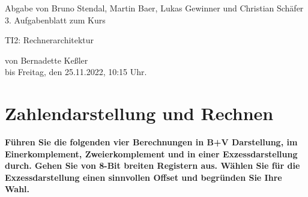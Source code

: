 \documentclass[11pt]{article}
\newcommand{\VORLESUNG}{TI2: Rechnerarchitektur}
\newcommand{\STUDENTS}{Bruno Stendal, Martin Baer, Lukas Gewinner und Christian Schäfer}
\newcommand{\STAFF}{Bernadette Keßler}
\newcommand{\ASSIGNMENT}{3}
\newcommand{\DELIVER}{Freitag, den 25.11.2022, 10:15 Uhr}
\newcommand{\aufgabe}[1]{\item{\bf #1}}
\begin{document}
\ofoot{\pagemark}
\begin{center}
    Abgabe von \STUDENTS{}\\
 \ASSIGNMENT{}. Aufgabenblatt  zum Kurs 
\vspace*{0.2cm}

{\Large \VORLESUNG{}}

{\small von \STAFF{} \\ bis \DELIVER{}.}
\vspace*{0.5cm}\\
\end{center}
\section{Zahlendarstellung und Rechnen}
\aufgabe{Führen Sie die folgenden vier Berechnungen in B+V Darstellung, im Einerkomplement, Zweierkomplement und in einer Exzessdarstellung durch. Gehen Sie von 8-Bit breiten Registern aus. Wählen Sie für die Exzessdarstellung einen sinnvollen Offset und begründen Sie Ihre Wahl.}
\end{document}
